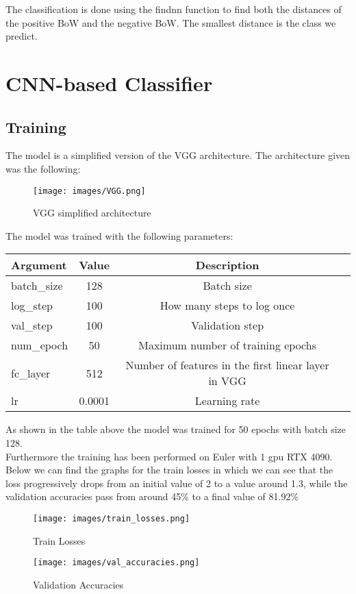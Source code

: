 \documentclass{ETHExercise}
\begin{document}
The classification is done using the findnn function to find both the 
distances of the positive BoW and the negative BoW. The smallest distance
is the class we predict.

\section{CNN-based Classifier}

\subsection{Training}
The model is a simplified version of the VGG architecture. The architecture given was
the following:

\begin{figure}[!h]
  \centering
  \texttt{[image: images/VGG.png]}
  \caption{VGG simplified architecture}
\end{figure}

The model was trained with the following parameters:
\begin{center}
  \begin{tabular}{|l|c|c|c|}
    \hline
    \textbf{Argument} & \textbf{Value} &  \textbf{Description} \\
    \hline
    batch\_size & 128 & Batch size \\
    log\_step & 100 & How many steps to log once \\
    val\_step & 100 &  Validation step \\
    num\_epoch & 50 & Maximum number of training epochs \\
    fc\_layer & 512 & Number of features in the first linear layer in VGG \\
    lr & 0.0001 &  Learning rate \\
    \hline
  \end{tabular}
\end{center}


As shown in the table above the model was trained for 50 epochs with batch size 128.
\\
Furthermore the training has been performed on Euler with 1 gpu RTX 4090. 
\\
Below we can find the graphs for the train losses in which we can see that the 
loss progressively drops from an initial value of 2 to a value around 1.3, while the validation accuracies
pass from around 45\% to a final value of 81.92\%

\begin{figure}[h]
  \centering
  \texttt{[image: images/train\_losses.png]}
  \caption{Train Losses}
\end{figure}
\begin{figure}[h]
  \centering
  \texttt{[image: images/val\_accuracies.png]}
  \caption{Validation Accuracies}
\end{figure}
\end{document}
